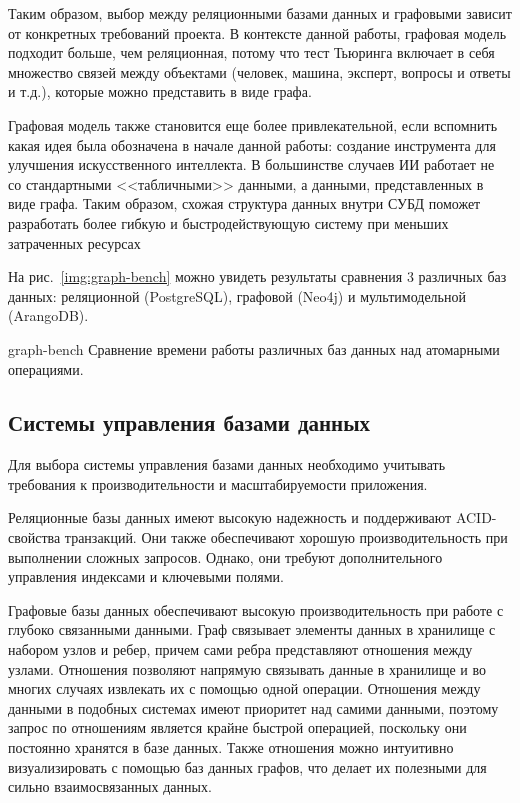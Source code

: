 Таким образом, выбор между реляционными базами данных и графовыми зависит от конкретных требований проекта.
В контексте данной работы, графовая модель подходит больше, чем реляционная, потому что тест Тьюринга включает в себя множество связей между объектами (человек, машина, эксперт, вопросы и ответы и т.д.), которые можно представить в виде графа.

Графовая модель также становится еще более привлекательной, если вспомнить какая идея была обозначена в начале данной работы: создание инструмента для улучшения искусственного интеллекта. В большинстве случаев ИИ работает не со стандартными <<табличными>> данными, а данными, представленных в виде графа. Таким образом, схожая структура данных внутри СУБД поможет разработать более гибкую и быстродействующую систему при меньших затраченных ресурсах

На рис.~\ref{img:graph-bench} можно увидеть результаты сравнения 3 различных баз данных: реляционной (PostgreSQL), графовой (Neo4j) и мультимодельной (ArangoDB).

\img{100mm}
{graph-bench}
{Сравнение времени работы различных баз данных над атомарными операциями.}

\clearpage

\subsection{Системы управления базами данных}

Для выбора системы управления базами данных необходимо учитывать требования к производительности и масштабируемости приложения.

Реляционные базы данных имеют высокую надежность и поддерживают ACID-свойства транзакций. Они также обеспечивают хорошую производительность при выполнении сложных запросов. Однако, они требуют дополнительного управления индексами и ключевыми полями.

Графовые базы данных обеспечивают высокую производительность при работе с глубоко связанными данными. Граф связывает элементы данных в хранилище с набором узлов и ребер, причем сами ребра представляют отношения между узлами. Отношения позволяют напрямую связывать данные в хранилище и во многих случаях извлекать их с помощью одной операции. Отношения между данными в подобных системах имеют приоритет над самими данными, поэтому запрос по отношениям является крайне быстрой операцией, поскольку они постоянно хранятся в базе данных. Также отношения можно интуитивно визуализировать с помощью баз данных графов, что делает их полезными для сильно взаимосвязанных данных. 


